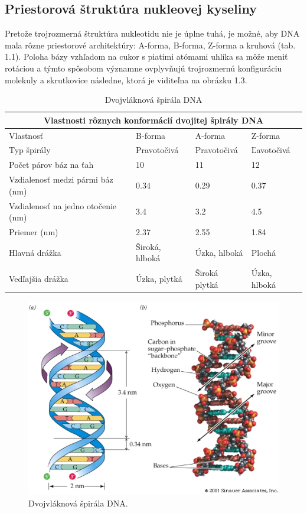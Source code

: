 \subsection{Priestorová štruktúra nukleovej kyseliny}
Pretože trojrozmerná štruktúra nukleotidu nie je úplne tuhá, je možné, aby DNA mala rôzne priestorové architektúry:
A-forma, B-forma, Z-forma a kruhová (tab. 1.1). Poloha bázy vzhľadom na cukor s piatimi atómami uhlíka sa môže meniť rotáciou
a týmto spôsobom významne ovplyvňujú trojrozmernú konfiguráciu molekuly a skrutkovice následne, ktorá je viditeľna na obrázku 1.3.
\begin{table}[!ht]
	\caption{Dvojvláknová špirála DNA}\label{t:1}
	\smallskip
	\centering
	
	\begin{tabular}{ |p{3cm}||p{3cm}|p{3cm}|p{3cm}|  }
		\hline
		\multicolumn{4}{|c|}{Vlastnosti rôznych konformácií dvojitej špirály DNA} \\
		\hline
		Vlastnosť& B-forma & A-forma & Z-forma\\
		\hline
		\hline
		Typ špirály & Pravotočivá & Pravotočivá & Ľavotočivá \\
		\hline
		Počet párov báz na ťah & 10 & 11 & 12\\
		\hline
		Vzdialenosť medzi pármi báz (nm) & 0.34 & 0.29 & 0.37\\
		\hline
		Vzdialenosť na jedno otočenie (nm) & 3.4 & 3.2 & 4.5\\
		\hline
		Priemer (nm) & 2.37 & 2.55 & 1.84\\
		\hline
		Hlavná drážka & Široká, hlboká & Úzka, hlboká & Plochá\\
		\hline
		Vedľajšia drážka & Úzka, plytká & Široká plytká & Úzka, hlboká\\
		\hline
	\end{tabular}
\end{table}

\begin{figure}[!ht]
	\centering
	\includegraphics[width=.85\textwidth]{figures/spatial.png}
	\caption{Dvojvláknová špirála DNA.\label{o:latex_friendly_zone}}
\end{figure}

